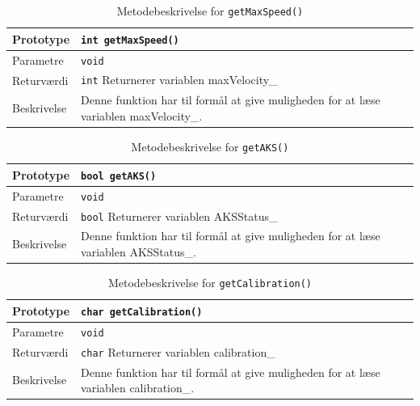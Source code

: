 \begin{table}[h!]
\begin{tabularx}{\textwidth}{| L{2.5 cm} | Z |} \hline
Prototype 	& \texttt{int getMaxSpeed()} \\\hline
Parametre 	& \texttt{void}			 \\\hline
Returværdi	& \texttt{int} 			\newline Returnerer variablen maxVelocity\_\\\hline
Beskrivelse	& Denne funktion har til formål at give muligheden for at læse variablen maxVelocity\_. \\\hline
\end{tabularx}
\caption{Metodebeskrivelse for \texttt{getMaxSpeed()}}
\label{table:met_getmaxspeed}
\end{table}

\clearpage

\begin{table}[h]
\begin{tabularx}{\textwidth}{| L{2.5 cm} | Z |} \hline
Prototype 	& \texttt{bool getAKS()} \\\hline
Parametre 	& \texttt{void}			 \\\hline
Returværdi	& \texttt{bool}			\newline Returnerer variablen AKSStatus\_\\\hline
Beskrivelse	& Denne funktion har til formål at give muligheden for at læse variablen AKSStatus\_. \\\hline
\end{tabularx}
\caption{Metodebeskrivelse for \texttt{getAKS()}}
\label{table:met_getaks}
\end{table}

\begin{table}[h]
\begin{tabularx}{\textwidth}{| L{2.5 cm} | Z |} \hline
Prototype 	& \texttt{char getCalibration()} \\\hline
Parametre 	& \texttt{void}			 \\\hline
Returværdi	& \texttt{char} 		\newline Returnerer variablen calibration\_\\\hline
Beskrivelse	& Denne funktion har til formål at give muligheden for at læse variablen calibration\_. \\\hline
\end{tabularx}
\caption{Metodebeskrivelse for \texttt{getCalibration()}}
\label{table:met_getcalibration}
\end{table}